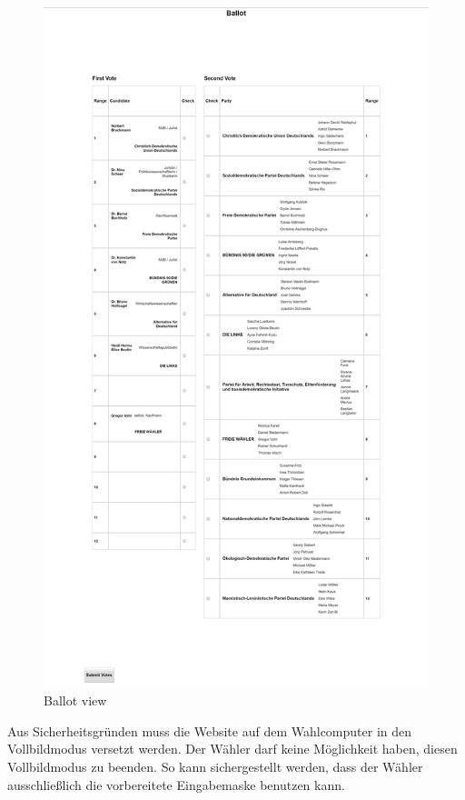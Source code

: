 \documentclass[a4paper]{scrreprt}
\begin{document}
\begin{figure}[H]
\centering
\includegraphics[width=\textwidth]{images/ballot.png}
\caption {Ballot view}
\end{figure}

Aus Sicherheitsgründen muss die Website auf dem Wahlcomputer in den Vollbildmodus versetzt werden. Der Wähler darf keine Möglichkeit haben, diesen Vollbildmodus zu beenden. So kann sichergestellt werden, dass der Wähler ausschließlich die vorbereitete Eingabemaske benutzen kann.
\end{document}
